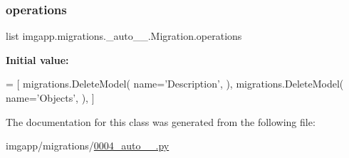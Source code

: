 \subsubsection{\texorpdfstring{operations}{operations}}
{\footnotesize\ttfamily list imgapp.\+migrations.\+\_\+auto\+\_\+\_.\+Migration.\+operations\hspace{0.3cm}{\ttfamily [static]}}

{\bfseries Initial value\+:}
\begin{DoxyCode}
=  [
        migrations.DeleteModel(
            name=\textcolor{stringliteral}{'Description'},
        ),
        migrations.DeleteModel(
            name=\textcolor{stringliteral}{'Objects'},
        ),
    ]
\end{DoxyCode}


The documentation for this class was generated from the following file\+:\begin{DoxyCompactItemize}
\item 
imgapp/migrations/\hyperlink{0004__auto__20190715__1327_8py}{0004\+\_\+auto\+\_\+\_.\+py}\end{DoxyCompactItemize}
